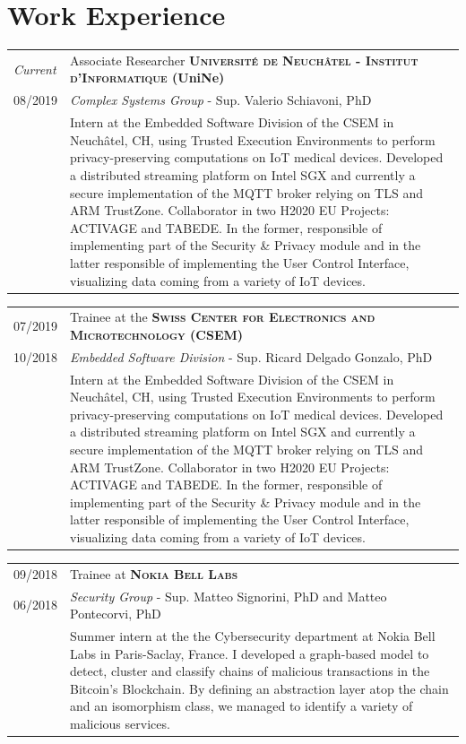 \documentclass[a4paper,10pt]{article} %
\begin{document}
\section{Work Experience}
%
\begin{tabular}{R{1.5cm}|p{13.8cm}}
    \emph{Current} & Associate Researcher \textbf{\textsc{Universit\'e de Neuch\^atel - Institut d'Informatique} (UniNe)} \\
    \textsc{08/2019} & \small{\emph{Complex Systems Group} - Sup. Valerio Schiavoni, PhD }\\ 
    & \footnotesize{Intern at the Embedded Software Division of the CSEM in Neuch\^atel, CH, using Trusted Execution Environments to perform privacy-preserving computations on IoT medical devices. Developed a distributed streaming platform on Intel SGX and currently a secure implementation of the MQTT broker relying on TLS and ARM TrustZone. Collaborator in two H2020 EU Projects: ACTIVAGE and TABEDE. In the former, responsible of implementing part of the Security \& Privacy module and in the latter responsible of implementing the User Control Interface, visualizing data coming from a variety of IoT devices.}
\end{tabular}

\begin{tabular}{R{1.5cm}|p{13.8cm}}
    \textsc{07/2019} & Trainee at the \textbf{\textsc{Swiss Center for Electronics and Microtechnology} (CSEM)} \\
    \textsc{10/2018} & \small{\emph{Embedded Software Division} - Sup. Ricard Delgado Gonzalo, PhD }\\ 
    & \footnotesize{Intern at the Embedded Software Division of the CSEM in Neuch\^atel, CH, using Trusted Execution Environments to perform privacy-preserving computations on IoT medical devices. Developed a distributed streaming platform on Intel SGX and currently a secure implementation of the MQTT broker relying on TLS and ARM TrustZone. Collaborator in two H2020 EU Projects: ACTIVAGE and TABEDE. In the former, responsible of implementing part of the Security \& Privacy module and in the latter responsible of implementing the User Control Interface, visualizing data coming from a variety of IoT devices.}
\end{tabular}

\begin{tabular}{R{1.5cm}|p{13.8cm}}
    \textsc{09/2018} & Trainee at \textbf{\textsc{Nokia Bell Labs}} \\
    \textsc{06/2018} & \small{\emph{Security Group} - Sup. Matteo Signorini, PhD and Matteo Pontecorvi, PhD}\\ 
& \footnotesize{Summer intern at the the Cybersecurity department at Nokia Bell Labs in Paris-Saclay, France. I developed a graph-based model to detect, cluster and classify chains of malicious transactions in the Bitcoin's Blockchain. By defining an abstraction layer atop the chain and an isomorphism class, we managed to identify a variety of malicious services.}
\end{tabular}
\end{document}
